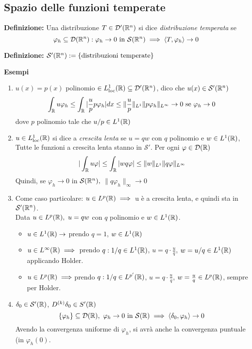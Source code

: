 \subsection{Spazio delle funzioni temperate}

\begin{tcolorbox}
	\textbf{Definizione: }Una distribuzione $T \in \mathcal D'(\mathbb{R}^n)$ si dice \emph{distribuzione temperata} se 
	\[\varphi_h \subseteq  \mathcal D(\mathbb{R}^n):\varphi_h\to 0\text{ in }\mathcal S(\mathbb{R}^n)\implies \left< T,\varphi_h \right> \to 0\]
\end{tcolorbox}
\begin{tcolorbox}
	\textbf{Definizione: }$\mathcal S'(\mathbb{R}^n):= \{\text{distribuzioni temperate}\} $
\end{tcolorbox}
\textbf{Esempi} 
\begin{enumerate}
	\item $u(x)=p(x)$ polinomio $\in L^1_{\text{loc}}(\mathbb{R})\subseteq  \mathcal D'(\mathbb{R}^n)$, dico che $u(x)\in \mathcal S'(\mathbb{R}^n)$ 
		\[\int_{\mathbb{R}}^{} u\varphi_h \le  \int_{\mathbb{R}}^{} |\frac{u}{p}p\varphi_h| dx\le \|\frac{u}{p}\|_{L^1}\|p\varphi_h\|_{L^\infty}\to 0\text{ se }\varphi_h\to 0\]
		dove $p$ polinomio tale che $u / p \in L^{1}(\mathbb{R})$ 
	\item $u\in L^1_{\text{loc}}(\mathbb{R})$ si dice a \emph{crescita lenta} se $u=qw$ con $q$ polinomio e $w\in L^{1}(\mathbb{R})$, Tutte le funzioni a crescita lenta stanno in  $\mathcal S'$. Per ogni $\varphi \in \mathcal D(\mathbb{R})$ 
		\[|\int_{\mathbb{R}}^{} u\varphi |\le  \int_{\mathbb{R}}^{} |wq\varphi|\le \|w\|_{L^1}\|q\varphi\|_{L^\infty}\]
		Quindi, se $\varphi_h\to 0$ in $\mathcal S(\mathbb{R}^n),$ $\|q\varphi_h\|_{\infty}\to 0$
	\item Come caso particolare: $u\in L^{p}(\mathbb{R})\implies $ u è a crescita lenta, e quindi sta in $\mathcal S'(\mathbb{R}^n)$.\\
		Data $u\in L^{p}(\mathbb{R}), \ u=qw$ con $q$ polinomio e $w\in L^{1}(\mathbb{R})$.
		\begin{itemize}
			\item $u\in L^{1}(\mathbb{R})\rightarrow $ prendo $q=1$, $w \in L^1(\mathbb{R})$ 
			\item $u\in L^{\infty}(\mathbb{R})\implies $ prendo $q:1 / q \in L^{1}(\mathbb{R})$, $u=q\cdot \frac{u}{q}$, $w=u / q \in L^{1}(\mathbb{R})$ applicando Holder.
			\item $u \in L^{p}(\mathbb{R})\implies $prendo $q:1 / q \in L^{p'}(\mathbb{R})$, $u=q\cdot \frac{u}{q}$, $w=\frac{u}{q}\in L^{p}(\mathbb{R})$, sempre per Holder.
		\end{itemize}
	\item $\delta_0\in \mathcal S'(\mathbb{R})$, $D^{(k)}\delta_0\in S'(\mathbb{R})$
		\[\{\varphi_h\} \subseteq  \mathcal D(\R),\ \varphi_h\to 0\text{ in }\mathcal S(\R)\implies \left< \delta_0,\varphi_h \right> \to 0\]
		Avendo la convergenza uniforme di $\varphi_h$, si avrà anche la convergenza puntuale (in $\varphi_h(0)$.

\end{enumerate}
